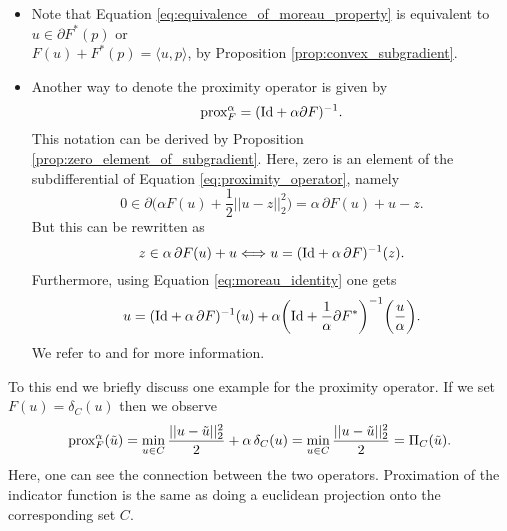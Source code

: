     \begin{remark}
        \begin{itemize}
            \item Note that Equation \ref{eq:equivalence_of_moreau_property} is equivalent to $u \in \partial F^{\ast}(p)$ or\\
            $F(u) + F^{\ast}(p) = \langle u, p \rangle$, by Proposition \ref{prop:convex_subgradient}.
            \item Another way to denote the proximity operator is given by
                \begin{equation}
                    \textnormal{prox}^{\alpha}_{F} = (\textnormal{Id} + \alpha \partial F)^{-1}.
                    \label{eq:proximity_operator_reloaded}
                \end{equation}
            This notation can be derived by Proposition \ref{prop:zero_element_of_subgradient}. Here, zero is an element of the subdifferential of Equation \ref{eq:proximity_operator}, namely
                $$
                    0 \in \partial \big( \alpha F(u) + \frac{1}{2} ||u - z||_{2}^{2} \big) = \alpha \, \partial F(u) + u - z.
                $$
            But this can be rewritten as
                $$
                    z \in \alpha\,\partial F(u) + u \Longleftrightarrow u = (\textnormal{Id} + \alpha \, \partial F)^{-1}(z).
                $$
            Furthermore, using Equation \ref{eq:moreau_identity} one gets
                \begin{equation}
                    u = (\textnormal{Id} + \alpha \, \partial F)^{-1}(u) + \alpha \bigg( \textnormal{Id} + \frac{1}{\alpha} \partial F^{\ast} \bigg)^{-1} \bigg(\frac{u}{\alpha}\bigg).
                    \label{eq:moreau_identity_reloaded}
                \end{equation}
            We refer to \cite{Rockafellar} and \cite{Chambolle-et-al-10} for more information.
        \end{itemize}
    \end{remark}

    \begin{example}
        To this end we briefly discuss one example for the proximity operator. If we set $F(u) = \delta_{C}(u)$ then we observe
            $$
                \textnormal{prox}^{\alpha}_{F}(\tilde{u}) = \min\limits_{u \in C} \frac{||u - \tilde{u}||_{2}^{2}}{2} + \alpha \, \delta_{C}(u) = \min\limits_{u \in C} \frac{||u - \tilde{u}||_{2}^{2}}{2} = \Pi_{C}(\tilde{u}).
            $$
        Here, one can see the connection between the two operators. Proximation of the indicator function is the same as doing a euclidean projection onto the corresponding set $C$.
    \label{ex:proximity_operator}
    \end{example}

